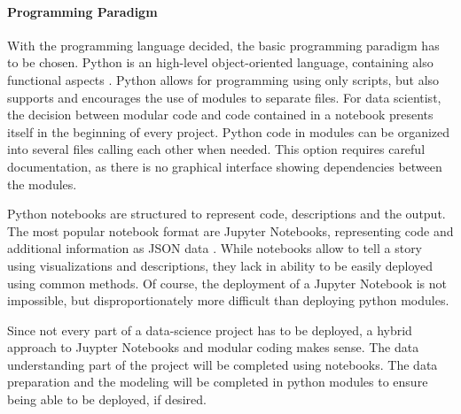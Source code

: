 \paragraph{Programming Paradigm}
With the programming language decided, the basic programming paradigm has to be chosen. Python is an high-level object-oriented language, containing also functional aspects \cite[chapter~1.3.2]{corePython}. Python allows for programming using only scripts, but also supports and encourages the use of modules to separate files.
For data scientist, the decision between modular code and code contained in a notebook presents itself in the beginning of every project. Python code in modules can be organized into several files calling each other when needed. This option requires careful documentation, as there is no graphical interface showing dependencies between the modules.

Python notebooks are structured to represent code, descriptions and the output. The most popular notebook format are Jupyter Notebooks, representing code and additional information as \ac{JSON} data \cite{jupyterteamArchitecture}.
While notebooks allow to tell a story using visualizations and descriptions, they lack in ability to be easily deployed using common methods. Of course, the deployment of a Jupyter Notebook is not impossible, but disproportionately more difficult than deploying python modules.

Since not every part of a data-science project has to be deployed, a hybrid approach to Juypter Notebooks and modular coding makes sense. The data understanding part of the project will be completed using notebooks. The data preparation and the modeling will be completed in python modules to ensure being able to be deployed, if desired.












